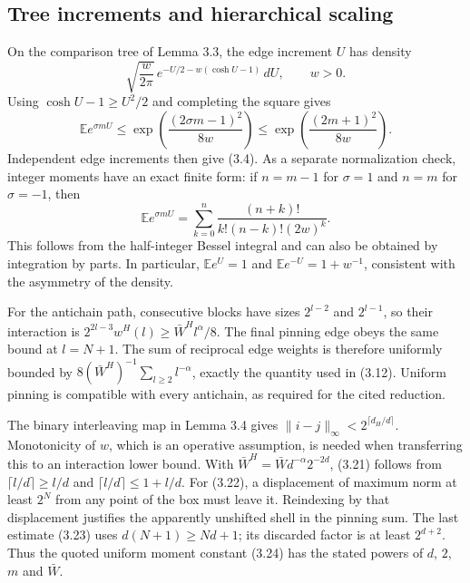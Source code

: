 \documentclass[10pt]{article}
\begin{document}
\subsection*{Tree increments and hierarchical scaling}
On the comparison tree of Lemma 3.3, the edge increment \(U\) has density \[\sqrt{\frac w{2\pi}}\,
 e^{-U/2-w(\cosh U-1)}\,dU,\qquad w>0.\] Using \(\cosh U-1\geq U^2/2\) and completing the square gives \[\mathbb Ee^{\sigma mU}
 \leq\exp\!\left(\frac{(2\sigma m-1)^2}{8w}\right)
 \leq\exp\!\left(\frac{(2m+1)^2}{8w}\right).\] Independent edge increments then give (3.4). As a separate normalization check, integer moments have an exact finite form: if \(n=m-1\) for \(\sigma=1\) and \(n=m\) for \(\sigma=-1\), then \[\mathbb Ee^{\sigma mU}
 =\sum_{k=0}^{n}\frac{(n+k)!}{k!(n-k)!(2w)^k}.\] This follows from the half-integer Bessel integral and can also be obtained by integration by parts. In particular, \(\mathbb Ee^U=1\) and \(\mathbb Ee^{-U}=1+w^{-1}\), consistent with the asymmetry of the density.\par
For the antichain path, consecutive blocks have sizes \(2^{l-2}\) and \(2^{l-1}\), so their interaction is \(2^{2l-3}w^H(l)\geq\bar W^H l^\alpha/8\). The final pinning edge obeys the same bound at \(l=N+1\). The sum of reciprocal edge weights is therefore uniformly bounded by \(8(\bar W^H)^{-1}\sum_{l\geq2}l^{-\alpha}\), exactly the quantity used in (3.12). Uniform pinning is compatible with every antichain, as required for the cited reduction.\par
The binary interleaving map in Lemma 3.4 gives \(\|i-j\|_\infty<2^{\lceil d_H/d\rceil}\). Monotonicity of \(w\), which is an operative assumption, is needed when transferring this to an interaction lower bound. With \(\bar W^H=\bar Wd^{-\alpha}2^{-2d}\), (3.21) follows from \(\lceil l/d\rceil\geq l/d\) and \(\lceil l/d\rceil\leq1+l/d\). For (3.22), a displacement of maximum norm at least \(2^N\) from any point of the box must leave it. Reindexing by that displacement justifies the apparently unshifted shell in the pinning sum. The last estimate (3.23) uses \(d(N+1)\geq Nd+1\); its discarded factor is at least \(2^{d+2}\). Thus the quoted uniform moment constant (3.24) has the stated powers of \(d\), \(2\), \(m\) and \(\bar W\).\par
\end{document}
